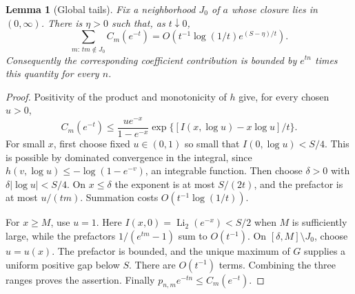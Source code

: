 \documentclass[11pt,letterpaper]{article}
\numberwithin{equation}{section}
\newtheorem{lemma}[theorem]{Lemma}
\theoremstyle{definition}\newtheorem{definition}[theorem]{Definition}
\theoremstyle{remark}\newtheorem{remark}[theorem]{Remark}
\DeclareMathOperator{\Li}{Li}
\begin{document}
\begin{lemma}[Global tails]\label{mss:lem:globaltails}
Fix a neighborhood $J_0$ of $a$ whose closure lies in $(0,\infty)$. There is $\eta>0$ such that, as $t\downarrow0$,
\begin{equation}\label{mss:eq:globaltails}
\sum_{m:\,tm\notin J_0}C_m(e^{-t})
=O\left(t^{-1}\log(1/t)e^{(S-\eta)/t}\right).
\end{equation}
Consequently the corresponding coefficient contribution is bounded by $e^{tn}$ times this quantity for every $n$.
\end{lemma}
\begin{proof}
Positivity of the product and monotonicity of $h$ give, for every chosen $u>0$,
\begin{equation}\label{mss:eq:chernoff}
C_m(e^{-t})\le
\frac{u e^{-x}}{1-e^{-x}}
\exp\{[I(x,\log u)-x\log u]/t\}.
\end{equation}
For small $x$, first choose fixed $u\in(0,1)$ so small that $I(0,\log u)<S/4$. This is possible by dominated convergence in the integral, since $h(v,\log u)\le-\log(1-e^{-v})$, an integrable function. Then choose $\delta>0$ with $\delta|\log u|<S/4$. On $x\le\delta$ the exponent is at most $S/(2t)$, and the prefactor is at most $u/(tm)$. Summation costs $O(t^{-1}\log(1/t))$.

For $x\ge M$, use $u=1$. Here $I(x,0)=\Li_2(e^{-x})<S/2$ when $M$ is sufficiently large, while the prefactors $1/(e^{tm}-1)$ sum to $O(t^{-1})$. On $[\delta,M]\setminus J_0$, choose $u=u(x)$. The prefactor is bounded, and the unique maximum of $G$ supplies a uniform positive gap below $S$. There are $O(t^{-1})$ terms. Combining the three ranges proves the assertion. Finally $p_{n,m}e^{-tn}\le C_m(e^{-t})$.
\end{proof}
\end{document}
